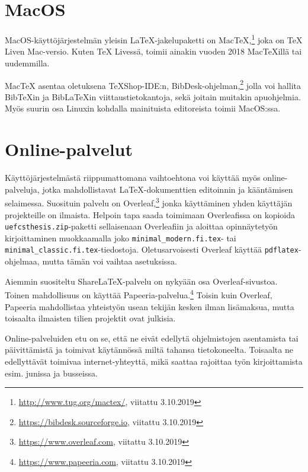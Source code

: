 \section{MacOS}
\label{sec:latex:macos}

MacOS-käyttöjärjestelmän yleisin \LaTeX-jakelupaketti on MacTeX,\footnote{\url{http://www.tug.org/mactex/}, viitattu 3.10.2019} joka on TeX Liven Mac-versio. Kuten TeX Livessä, \uefcsthesis toimii ainakin vuoden 2018 MacTeXillä tai uudemmilla.

MacTeX asentaa oletuksena TeXShop-IDE:n, BibDesk-ohjelman,\footnote{\url{https://bibdesk.sourceforge.io}, viitattu 3.10.2019} jolla voi hallita Bib\TeX{in} ja Bib\LaTeX{in} viittaustietokantoja, sekä joitain muitakin apuohjelmia.  Myös suurin osa Linuxin kohdalla mainituista editoreista toimii MacOS:ssa.

\section{Online-palvelut}
\label{sec:latex:internet}

Käyttöjärjestelmästä riippumattomana vaihtoehtona voi käyttää myös online-palveluja, jotka mahdollistavat \LaTeX-dokumenttien editoinnin ja kääntämisen selaimessa. Suosituin palvelu on Overleaf,\footnote{\url{https://www.overleaf.com}, viitattu 3.10.2019} jonka käyttäminen yhden käyttäjän projekteille on ilmaista. Helpoin tapa saada \uefcsthesis toimimaan Overleafissa on kopioida \texttt{uefcsthesis.zip}-paketti sellaisenaan Overleafiin ja aloittaa opinnäytetyön kirjoittaminen muokkaamalla joko \texttt{minimal\_modern.fi.tex}- tai \texttt{minimal\_classic.fi.tex}-tiedostoja. Oletusarvoisesti Overleaf käyttää \texttt{pdflatex}-ohjelmaa, mutta tämän voi vaihtaa asetuksissa.

Aiemmin suositeltu ShareLaTeX-palvelu on nykyään osa Overleaf-sivustoa. Toinen mahdollisuus on käyttää Papeeria-palvelua.\footnote{\url{https://www.papeeria.com}, viitattu 3.10.2019} Toisin kuin Overleaf, Papeeria mahdollistaa yhteistyön usean tekijän kesken ilman lisämaksua, mutta toisaalta ilmaisten tilien projektit ovat julkisia.

Online-palveluiden etu on se, että ne eivät edellytä ohjelmistojen asentamista tai päivittämistä ja toimivat käytännössä miltä tahansa tietokoneelta. Toisaalta ne edellyttävät toimivaa internet-yhteyttä, mikä saattaa rajoittaa työn kirjoittamista esim. junissa ja busseissa.


